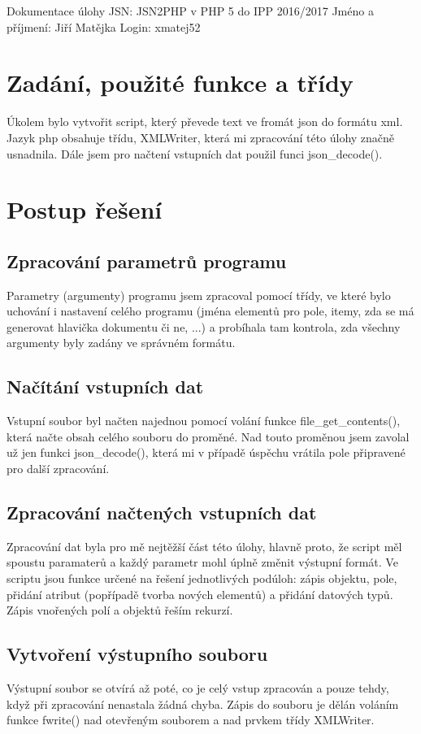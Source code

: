 \documentclass[a4paper, 10pt]{article}
\begin{document}
    Dokumentace úlohy JSN: JSN2PHP v PHP 5 do IPP 2016/2017
    Jméno a příjmení: Jiří Matějka
    Login: xmatej52
    \section{Zadání, použité funkce a třídy}
        Úkolem bylo vytvořit script, který převede text ve fromát json do formátu
        xml. Jazyk php obsahuje třídu, XMLWriter, která mi zpracování této úlohy
        značně usnadnila. Dále jsem pro načtení vstupních dat použil funci
        json_decode().
    \section{Postup řešení}
        \subsection{Zpracování parametrů programu}
            Parametry (argumenty) programu jsem zpracoval pomocí třídy, ve které
            bylo uchování i nastavení celého programu (jména elementů pro pole,
            itemy, zda se má generovat hlavička dokumentu či ne, ...) a probíhala
            tam kontrola, zda všechny argumenty byly zadány ve správném formátu.
        \subsection{Načítání vstupních dat}
            Vstupní soubor byl načten najednou pomocí volání funkce file_get_contents(),
            která načte obsah celého souboru do proměné. Nad touto proměnou jsem
            zavolal už jen funkci json_decode(), která mi v případě úspěchu vrátila
            pole připravené pro další zpracování.
        \subsection{Zpracování načtených vstupních dat}
            Zpracování dat byla pro mě nejtěžší část této úlohy, hlavně proto, že
            script měl spoustu paramaterů a každý parametr mohl úplně změnit
            výstupní formát. Ve scriptu jsou funkce určené na řešení jednotlivých
            podúloh: zápis objektu, pole, přidání atribut (popřípadě tvorba nových
            elementů) a přidání datových typů. Zápis vnořených polí a objektů
            řeším rekurzí.
        \subsection{Vytvoření výstupního souboru}
            Výstupní soubor se otvírá až poté, co je celý vstup zpracován a pouze
            tehdy, když při zpracování nenastala žádná chyba. Zápis do souboru
            je dělán voláním funkce fwrite() nad otevřeným souborem a nad prvkem
            třídy XMLWriter.
\end{document}
